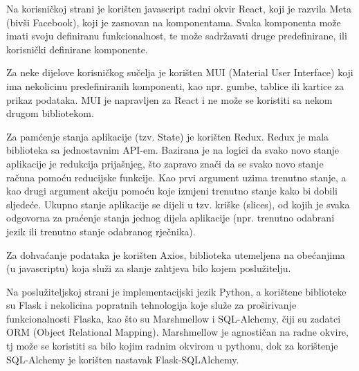                     Na korisničkoj strani je korišten javascript radni okvir React, koji je razvila Meta (bivši Facebook), koji je 
                zasnovan na komponentama. Svaka komponenta može imati svoju definiranu funkcionalnost, te može sadržavati druge predefinirane, 
                ili korisnički definirane komponente.

                    Za neke dijelove korisničkog sučelja je korišten MUI (Material User Interface) koji ima nekolicinu predefiniranih
                komponenti, kao npr. gumbe, tablice ili kartice za prikaz podataka. MUI je napravljen za React i ne može se koristiti
                sa nekom drugom bibliotekom.

                    Za pamćenje stanja aplikacije (tzv. State) je korišten Redux. Redux je mala biblioteka sa jednostavnim API-em.
                Bazirana je na logici da svako novo stanje aplikacije je redukcija prijašnjeg, što zapravo znači da se
                svako novo stanje računa pomoću reducijske funkcije. Kao prvi argument uzima trenutno stanje, a kao drugi
                argument akciju pomoću koje izmjeni trenutno stanje kako bi dobili sljedeće. Ukupno stanje aplikacije se 
                dijeli u tzv. kriške (slices), od kojih je svaka odgovorna za praćenje stanja jednog dijela aplikacije (npr.
                trenutno odabrani jezik ili trenutno stanje odabranog rječnika).

                    Za dohvaćanje podataka je korišten Axios, biblioteka utemeljena na obećanjima (u javascriptu) koja služi
                za slanje zahtjeva bilo kojem poslužitelju. 

                    Na poslužiteljskoj strani je implementacijski jezik Python, a korištene biblioteke su Flask i nekolicina popratnih
                tehnologija koje služe za proširivanje funkcionalnosti Flaska, kao što su Marshmellow i SQL-Alchemy, čiji su
                zadatci ORM (Object Relational Mapping). Marshmellow je agnostičan na radne okvire, tj može se koristiti sa bilo
                kojim radnim okvirom u pythonu, dok za korištenje SQL-Alchemy je korišten nastavak Flask-SQLAlchemy. 

